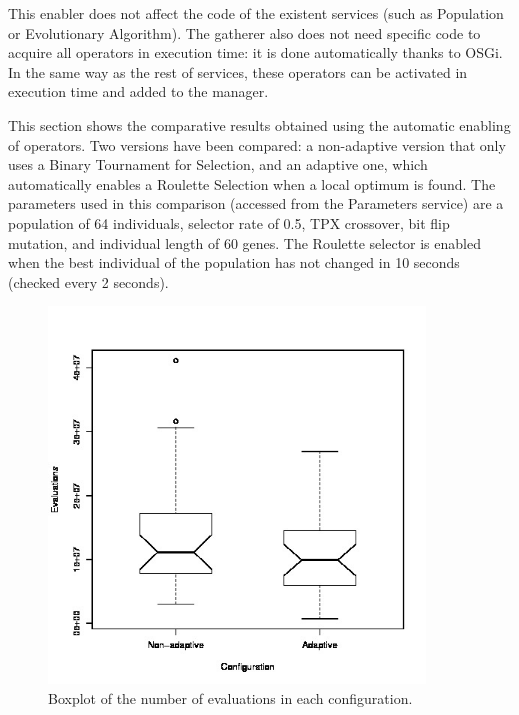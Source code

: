This enabler does not affect the code of the existent services (such as Population or Evolutionary Algorithm). The gatherer also does not need specific code to acquire all
operators in execution time: it is done automatically thanks to
OSGi. In the same way as the rest of services, these operators can be activated in
execution time and added to the manager.  

This section shows the comparative results obtained using the automatic enabling of operators. Two versions have been compared: a non-adaptive version that only uses a Binary Tournament for Selection, and an adaptive one, which automatically enables a Roulette Selection when a local optimum is found. The parameters used in this comparison (accessed from the Parameters service) are a population of 64 individuals, selector rate of 0.5, TPX crossover, bit flip mutation, and individual length of 60 genes. The Roulette selector is enabled when the best individual of the population has not changed in 10 seconds (checked every 2 seconds).


\begin{figure}
\centering
\includegraphics[width=10cm]{gfx/osgiliath/datos.jpg}
\caption{Boxplot of the number of evaluations in each configuration.}
\label{fig:osgiliath:boxplot}
\end{figure}

